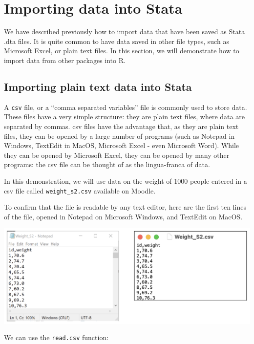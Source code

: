 \documentclass[
]{memoir}
\begin{document}
\hypertarget{importing-data-into-stata}{%
\section{Importing data into Stata}\label{importing-data-into-stata}}

We have described previously how to import data that have been saved as Stata .dta files. It is quite common to have data saved in other file types, such as Microsoft Excel, or plain text files. In this section, we will demonstrate how to import data from other packages into R.

\hypertarget{importing-plain-text-data-into-stata}{%
\subsection{Importing plain text data into Stata}\label{importing-plain-text-data-into-stata}}

A \texttt{csv} file, or a ``comma separated variables'' file is commonly used to store data. These files have a very simple structure: they are plain text files, where data are separated by commas. csv files have the advantage that, as they are plain text files, they can be opened by a large number of programs (such as Notepad in Windows, TextEdit in MacOS, Microsoft Excel - even Microsoft Word). While they can be opened by Microsoft Excel, they can be opened by many other programs: the csv file can be thought of as the lingua-franca of data.

In this demonstration, we will use data on the weight of 1000 people entered in a csv file called \texttt{weight\_s2.csv} available on Moodle.

To confirm that the file is readable by any text editor, here are the first ten lines of the file, opened in Notepad on Microsoft Windows, and TextEdit on MacOS.

\includegraphics[width=0.66\linewidth]{img/mod02/import-01}

We can use the \texttt{read.csv} function:
\end{document}
